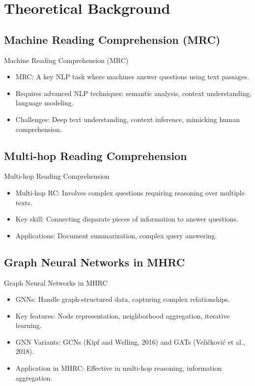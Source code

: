 \documentclass[10pt]{beamer}
\begin{document}
\section{Theoretical Background}

\subsection{Machine Reading Comprehension (MRC)}

\begin{frame}{Machine Reading Comprehension (MRC)}
  \begin{itemize}
    \item MRC: A key NLP task where machines answer questions using text passages.
    \item Requires advanced NLP techniques: semantic analysis, context understanding, language modeling.
    \item Challenges: Deep text understanding, context inference, mimicking human comprehension.
  \end{itemize}
\end{frame}

\subsection{Multi-hop Reading Comprehension}

\begin{frame}{Multi-hop Reading Comprehension}
  \begin{itemize}
    \item Multi-hop RC: Involves complex questions requiring reasoning over multiple texts.
    \item Key skill: Connecting disparate pieces of information to answer questions.
    \item Applications: Document summarization, complex query answering.
  \end{itemize}
\end{frame}

\subsection{Graph Neural Networks in MHRC}

\begin{frame}{Graph Neural Networks in MHRC}
  \begin{itemize}
    \item GNNs: Handle graph-structured data, capturing complex relationships.
    \item Key features: Node representation, neighborhood aggregation, iterative learning.
    \item GNN Variants: GCNs (Kipf and Welling, 2016) and GATs (Veličković et al., 2018).
    \item Application in MHRC: Effective in multi-hop reasoning, information aggregation.
  \end{itemize}
\end{frame}
\end{document}
